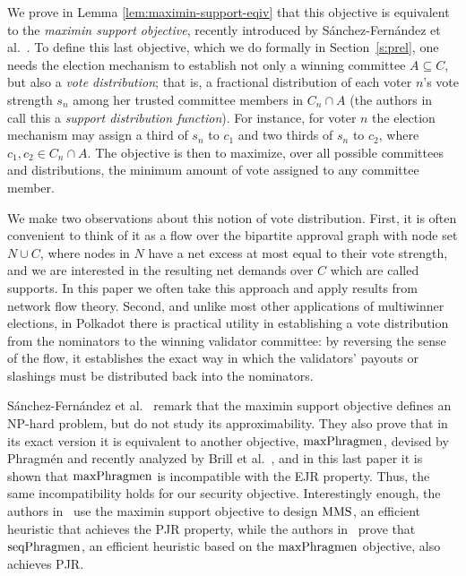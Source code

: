 We prove in Lemma \ref{lem:maximin-support-eqiv} that this objective is equivalent to the \emph{maximin support objective}, recently introduced by Sánchez-Fernández et al.~\cite{sanchez2016maximin}. 
To define this last objective, which we do formally in Section~\ref{s:prel}, one needs the election mechanism to establish not only a winning committee $A\subseteq C$, but also a \emph{vote distribution}; that is, a fractional distribution of each voter $n$'s vote strength $s_n$ among her trusted committee members in $C_n\cap A$ (the authors in~\cite{sanchez2016maximin} call this a \emph{support distribution function}). For instance, for voter $n$ the election mechanism may assign a third of $s_n$ to $c_1$ and two thirds of $s_n$ to $c_2$, where $c_1, c_2\in C_n\cap A$. 
The objective is then to maximize, over all possible committees and distributions, the minimum amount of vote assigned to any committee member. 

We make two observations about this notion of vote distribution. First, it is often convenient to think of it as a flow over the bipartite approval graph with node set $N\cup C$, where nodes in $N$ have a net excess at most equal to their vote strength, and we are interested in the resulting net demands over $C$ which are called supports. In this paper we often take this approach and apply results from network flow theory. 
Second, and unlike most other applications of multiwinner elections, in Polkadot there is practical utility in establishing a vote distribution from the nominators to the winning validator committee: by reversing the sense of the flow, it establishes the exact way in which the validators' payouts or slashings must be distributed back into the nominators.

Sánchez-Fernández et al.~\cite{sanchez2016maximin} remark that the maximin support objective defines an NP-hard problem, but do not study its approximability. They also prove that in its exact version it is equivalent to another objective, $\operatorname{maxPhragmen}$, devised by Phragm\'{e}n and recently analyzed by Brill et al.~\cite{brill2017phragmen}, and in this last paper it is shown that $\operatorname{maxPhragmen}$ is incompatible with the EJR property. Thus, the same incompatibility holds for our security objective. Interestingly enough, the authors in~\cite{sanchez2016maximin} use the maximin support objective to design $\operatorname{MMS}$, an efficient heuristic that achieves the PJR property, while the authors in~\cite{brill2017phragmen} prove that $\operatorname{seqPhragmen}$, an efficient heuristic based on the $\operatorname{maxPhragmen}$ objective, also achieves PJR.

